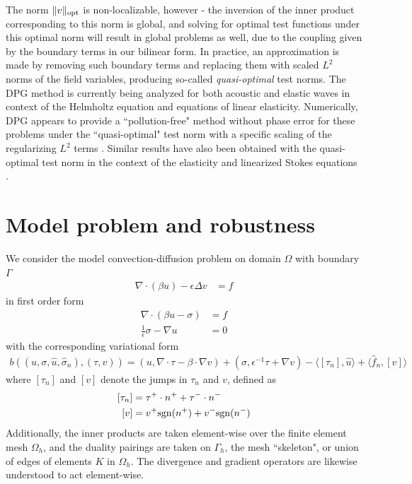 \documentclass[11pt,onecolumn]{scrartcl}
\newcommand{\grad}{\nabla}
\renewcommand{\div}{\grad \cdot}
\begin{document}
The norm $\|v\|_{\rm opt}$ is non-localizable, however - the inversion of the inner product corresponding to this norm is global, and solving for optimal test functions under this optimal norm will result in global problems as well, due to the coupling given by the boundary terms in our bilinear form.  In practice, an approximation is made by removing such boundary terms and replacing them with scaled $L^2$ norms of the field variables, producing so-called \textit{quasi-optimal} test norms.  The DPG method is currently being analyzed for both acoustic and elastic waves in context of the Helmholtz equation and equations of linear elasticity.  Numerically, DPG appears to provide a ``pollution-free" method without phase error for these problems under the ``quasi-optimal" test norm with a specific scaling of the regularizing $L^2$ terms \cite{DPG4}. Similar results have also been obtained with the quasi-optimal test norm in the context of the elasticity \cite{DPGElas} and linearized Stokes equations \cite{Camellia}. 

\section{Model problem and robustness}

We consider the model convection-diffusion problem on domain $\Omega$ with boundary $\Gamma$
\begin{align}
\div (\beta u) - \epsilon\Delta v &= f  \label{primal}
\end{align}
in first order form
\begin{align*}
\div (\beta u - \sigma) &= f  \\
\frac{1}{\epsilon}\sigma - \grad u &= 0
\end{align*}
with the corresponding variational form 
\begin{align*}
b\left(\left(u,\sigma, \widehat{u}, \widehat{\sigma}_n\right), \left(\tau, v\right)\right) = \left(u,\div \tau - \beta \cdot \grad v\right) + \left(\sigma, \epsilon^{-1} \tau + \grad v\right) - \langle \left[\tau_n\right], \widehat{u} \rangle + \langle \widehat{f}_n, \left[v\right] \rangle 
\end{align*}
where $\left[ \tau_n \right]$ and $\left[ v\right]$ denote the jumps in $\tau_n$ and $v$, defined as
\begin{align*}
\left[ \tau_n \right] &= \tau^+ \cdot n^+ + \tau^-\cdot n^-\\
\left[ v\right] &= v^+{\rm sgn}(n^+) + v^-{\rm sgn}(n^-)
\end{align*}
Additionally, the inner products are taken element-wise over the finite element mesh $\Omega_h$, and the duality pairings are taken on $\Gamma_h$, the mesh ``skeleton", or union of edges of elements $K$ in $\Omega_h$.  The divergence and gradient operators are likewise understood to act element-wise. 
\end{document}

